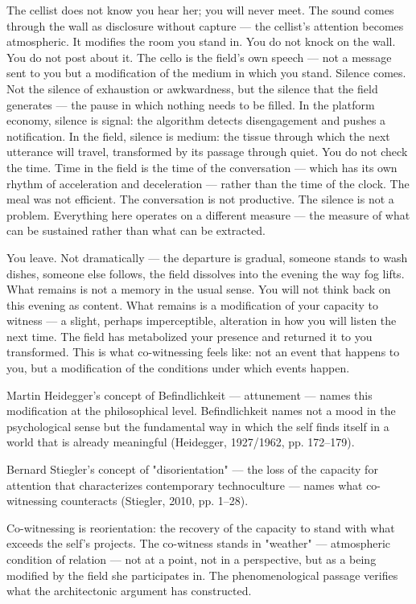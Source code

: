The cellist does not know you hear her; you will never meet. The sound comes through the wall as disclosure without capture — the cellist's attention becomes atmospheric. It modifies the room you stand in. You do not knock on the wall. You do not post about it. The cello is the field's own speech — not a message sent to you but a modification of the medium in which you stand. Silence comes. Not the silence of exhaustion or awkwardness, but the silence that the field generates — the pause in which nothing needs to be filled. In the platform economy, silence is signal: the algorithm detects disengagement and pushes a notification. In the field, silence is medium: the tissue through which the next utterance will travel, transformed by its passage through quiet. You do not check the time. Time in the field is the time of the conversation — which has its own rhythm of acceleration and deceleration — rather than the time of the clock. The meal was not efficient. The conversation is not productive. The silence is not a problem. Everything here operates on a different measure — the measure of what can be sustained rather than what can be extracted.

You leave. Not dramatically — the departure is gradual, someone stands to wash dishes, someone else follows, the field dissolves into the evening the way fog lifts. What remains is not a memory in the usual sense. You will not think back on this evening as content. What remains is a modification of your capacity to witness — a slight, perhaps imperceptible, alteration in how you will listen the next time. The field has metabolized your presence and returned it to you transformed. This is what co-witnessing feels like: not an event that happens to you, but a modification of the conditions under which events happen.

Martin Heidegger's concept of Befindlichkeit — attunement — names this modification at the philosophical level. Befindlichkeit names not a mood in the psychological sense but the fundamental way in which the self finds itself in a world that is already meaningful (Heidegger, 1927/1962, pp. 172–179).

Bernard Stiegler's concept of "disorientation" — the loss of the capacity for attention that characterizes contemporary technoculture — names what co-witnessing counteracts (Stiegler, 2010, pp. 1–28).

Co-witnessing is reorientation: the recovery of the capacity to stand with what exceeds the self's projects. The co-witness stands in "weather" — atmospheric condition of relation — not at a point, not in a perspective, but as a being modified by the field she participates in. The phenomenological passage verifies what the architectonic argument has constructed.

